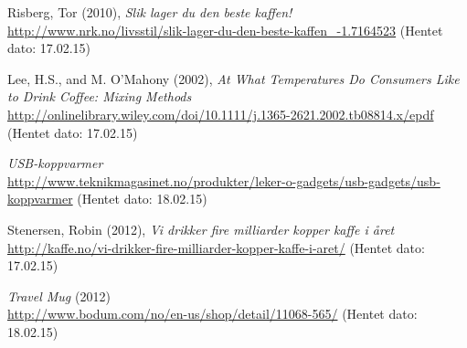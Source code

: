 \documentclass[abstract=on]{scrreprt}
\begin{document}
\scriptsize


\tableofcontents







\begin{thebibliography}{10}
Risberg, Tor (2010), \textit{Slik lager du den beste kaffen!} \\
\url{http://www.nrk.no/livsstil/slik-lager-du-den-beste-kaffen_-1.7164523} (Hentet dato: 17.02.15)

Lee, H.S., and M. O'Mahony (2002), \textit{At What Temperatures Do Consumers Like to Drink Coffee: Mixing Methods} \\
\url{http://onlinelibrary.wiley.com/doi/10.1111/j.1365-2621.2002.tb08814.x/epdf} (Hentet dato: 17.02.15)

\textit{USB-koppvarmer}  \\
\url{http://www.teknikmagasinet.no/produkter/leker-o-gadgets/usb-gadgets/usb-koppvarmer} (Hentet dato: 18.02.15)

Stenersen, Robin (2012), \textit{Vi drikker fire milliarder kopper kaffe i året} \\
\url{http://kaffe.no/vi-drikker-fire-milliarder-kopper-kaffe-i-aret/} (Hentet dato: 17.02.15)

\textit{Travel Mug} (2012)\\
\url{http://www.bodum.com/no/en-us/shop/detail/11068-565/} (Hentet dato: 18.02.15)

\end{thebibliography}

%
%
\end{document}
